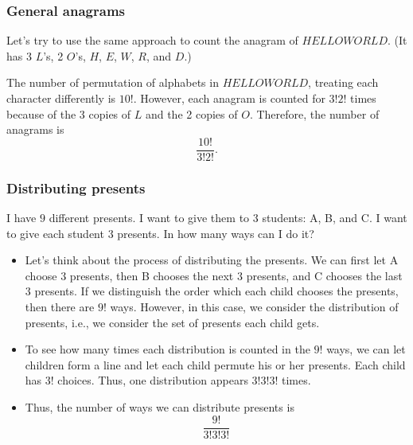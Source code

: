 \begin{frame}\frametitle{General anagrams}
  \begin{tcolorbox}
    Let's try to use the same approach to count the anagram of
    $HELLOWORLD$. (It has 3 $L$'s, 2 $O$'s, $H$, $E$, $W$, $R$, and
    $D$.)
  \end{tcolorbox}
  
  \pause
  \vspace{0.2in}
  
  The number of permutation of alphabets in $HELLOWORLD$, treating
  each character differently is $10!$.  However, each anagram is
  counted for $3!2!$ times because of the 3 copies of $L$ and the 2
  copies of $O$.  Therefore, the number of anagrams is
  \[
  \frac{10!}{3!2!}.
  \]
\end{frame}

\begin{frame}\frametitle{Distributing presents}
  \begin{tcolorbox}
    I have $9$ different presents.  I want to give them to $3$
    students: A, B, and C.  I want to give each student $3$ presents.
    In how many ways can I do it?
  \end{tcolorbox}
  
  \pause

  {\small
    \begin{itemize}
    \item Let's think about the process of distributing the
      presents. \pause We can first let A choose $3$ presents, then B
      chooses the next $3$ presents, and C chooses the last $3$
      presents. \pause If we distinguish the order which each child
      chooses the presents, then there are $9!$ ways. \pause However, in
      this case, we consider the distribution of presents, i.e., we
      consider the set of presents each child gets. \pause
    \item To see how many times each distribution is counted in the $9!$
      ways, we can let children form a line and let each child permute
      his or her presents.  Each child has $3!$ choices.  Thus, one
      distribution appears $3!3!3!$ times. \pause
    \item Thus, the number of ways we can distribute presents is
      \[ 
      \frac{9!}{3!3!3!}
      \]
    \end{itemize}
  }
\end{frame}

